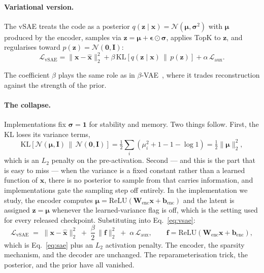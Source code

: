 \documentclass{article}
\begin{document}
\paragraph{Variational version.} The vSAE treats the code as a posterior
$q(\mathbf{z}\mid\mathbf{x})=\mathcal{N}(\boldsymbol{\mu},\boldsymbol{\sigma}^2)$
with $\boldsymbol{\mu}$ produced by the encoder, samples via
$\mathbf{z}=\boldsymbol{\mu}+\boldsymbol{\epsilon}\odot\boldsymbol{\sigma}$,
applies TopK to $\mathbf{z}$, and regularises toward $p(\mathbf{z})=\mathcal{N}(\mathbf{0},\mathbf{I})$:
\begin{equation}
\mathcal{L}_{\mathrm{vSAE}} = \|\mathbf{x}-\hat{\mathbf{x}}\|_2^2
+ \beta\,\mathrm{KL}\!\left[q(\mathbf{z}\mid\mathbf{x})\,\|\,p(\mathbf{z})\right]
+ \alpha\,\mathcal{L}_{\mathrm{aux}}.
\label{eq:vsae}
\end{equation}

The coefficient $\beta$ plays the same role as in $\beta$-VAE~\citep{higgins2017betavae},
where it trades reconstruction against the strength of the prior.

\paragraph{The collapse.} Implementations fix $\boldsymbol{\sigma}=\mathbf{1}$ for
stability and memory. Two things follow. First, the KL loses its variance terms,
\begin{equation}
\mathrm{KL}\!\left[\mathcal{N}(\boldsymbol{\mu},\mathbf{I})\,\|\,\mathcal{N}(\mathbf{0},\mathbf{I})\right]
= \tfrac{1}{2}\textstyle\sum_i \left(\mu_i^2 + 1 - 1 - \log 1\right)
= \tfrac{1}{2}\|\boldsymbol{\mu}\|_2^2 ,
\label{eq:kl}
\end{equation}
which is an $L_2$ penalty on the pre-activation. Second --- and this is the part
that is easy to miss --- when the variance is a fixed constant rather than a
learned function of $\mathbf{x}$, there is no posterior to sample from that
carries information, and implementations gate the sampling step off entirely. In
the implementation we study, the encoder computes
$\boldsymbol{\mu}=\mathrm{ReLU}(\mathbf{W}_{\mathrm{enc}}\mathbf{x}+\mathbf{b}_{\mathrm{enc}})$
and the latent is assigned $\mathbf{z}=\boldsymbol{\mu}$ whenever the
learned-variance flag is off, which is the setting used for every released
checkpoint. Substituting into Eq.~\ref{eq:vsae}:
\begin{equation}
\mathcal{L}_{\mathrm{vSAE}} \;=\; \|\mathbf{x}-\hat{\mathbf{x}}\|_2^2
\;+\; \frac{\beta}{2}\,\|\mathbf{f}\|_2^2 \;+\; \alpha\,\mathcal{L}_{\mathrm{aux}},
\qquad \mathbf{f}=\mathrm{ReLU}(\mathbf{W}_{\mathrm{enc}}\mathbf{x}+\mathbf{b}_{\mathrm{enc}}),
\label{eq:degenerate}
\end{equation}
which is Eq.~\ref{eq:sae} plus an $L_2$ activation penalty. The encoder, the
sparsity mechanism, and the decoder are unchanged. The reparameterisation trick,
the posterior, and the prior have all vanished.
\end{document}

